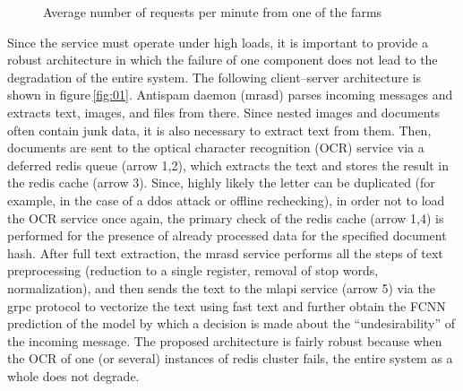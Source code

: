 \documentclass[12pt]{jpconf}
\begin{document}
\begin{figure}[b]
\centering


\caption{\label{fig:03} Average number of requests per minute from one of the farms}

\end{figure}

Since the service must operate under high loads, it is important to provide a robust architecture in which the failure of one component does not lead to the degradation of the entire system. The following client--server architecture is shown in figure\,\ref{fig:01}. Antispam daemon (mrasd) parses incoming messages and extracts text, images, and files from there. Since nested images and documents often contain junk data, it is also necessary to extract text from them. Then, documents are sent to the optical character recognition (OCR) service via a deferred redis queue (arrow 1,2), which extracts the text and stores the result in the redis cache (arrow 3).
Since, highly likely the letter can be duplicated (for example, in the case of a ddos attack or offline rechecking), in order not to load the OCR service once again, the primary check of the redis cache (arrow 1,4) is performed for the presence of already processed data for the specified document hash.
After full text extraction, the mrasd service performs all the steps of text preprocessing (reduction to a single register, removal of stop words, normalization), and then sends the text to the mlapi service (arrow 5) via the grpc protocol to vectorize the text using fast text and further obtain the FCNN prediction of the model by which a decision is made about the ``undesirability'' of the incoming message.
The proposed architecture is fairly robust because when the OCR of one (or several) instances of redis cluster fails, the entire system as a whole does not degrade.
 
\end{document}
